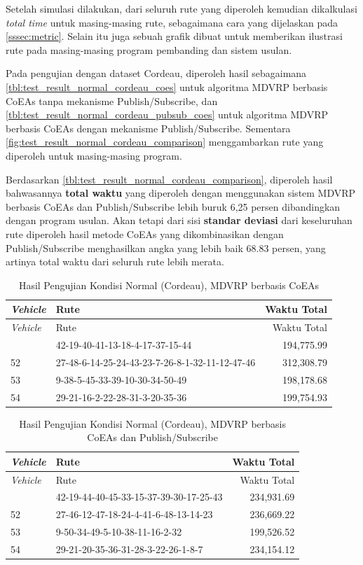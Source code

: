 Setelah simulasi dilakukan, dari seluruh rute yang diperoleh kemudian dikalkulasi \textit{total time} untuk masing-masing rute, sebagaimana cara yang dijelaskan pada \autoref{sssec:metric}. Selain itu juga sebuah grafik dibuat untuk memberikan ilustrasi rute pada masing-masing program pembanding dan sistem usulan.


Pada pengujian dengan dataset Cordeau, diperoleh hasil sebagaimana \autoref{tbl:test_result_normal_cordeau_coes} untuk algoritma MDVRP berbasis CoEAs tanpa mekanisme Publish/Subscribe, dan \autoref{tbl:test_result_normal_cordeau_pubsub_coes} untuk algoritma MDVRP berbasis CoEAs dengan mekanisme Publish/Subscribe. Sementara \autoref{fig:test_result_normal_cordeau_comparison} menggambarkan rute yang diperoleh untuk masing-masing program.


Berdasarkan \autoref{tbl:test_result_normal_cordeau_comparison}, diperoleh hasil bahwasannya \textbf{total waktu} yang diperoleh dengan menggunakan sistem MDVRP berbasis CoEAs dan Publish/Subscribe lebih buruk 6,25 persen  dibandingkan dengan program usulan. Akan tetapi dari sisi \textbf{standar deviasi} dari keseluruhan rute diperoleh hasil metode CoEAs yang dikombinasikan dengan Publish/Subscribe menghasilkan angka yang lebih baik 68.83 persen, yang artinya total waktu dari seluruh rute lebih merata.


\begin{longtable}[!]{lp{8cm}r}
	\caption{Hasil Pengujian Kondisi Normal (Cordeau), MDVRP berbasis CoEAs}
	\label{tbl:test_result_normal_cordeau_coes}\\
	\toprule
		\textit{Vehicle} & Rute & Waktu Total\\ 
	\midrule
	\endfirsthead
	\toprule
		\textit{Vehicle} & Rute & Waktu Total\\ 
	\midrule
	\endhead
	\bottomrule
	\endfoot
		51 & 42-19-40-41-13-18-4-17-37-15-44 & 194,775.99 \\
		52 & 27-48-6-14-25-24-43-23-7-26-8-1-32-11-12-47-46 & 312,308.79 \\
		53 & 9-38-5-45-33-39-10-30-34-50-49 & 198,178.68 \\
		54 & 29-21-16-2-22-28-31-3-20-35-36 & 199,754.93 \\
\end{longtable}


\begin{longtable}[!]{lp{8cm}r}
	\caption{Hasil Pengujian Kondisi Normal (Cordeau), MDVRP berbasis CoEAs dan Publish/Subscribe}
	\label{tbl:test_result_normal_cordeau_pubsub_coes}\\
	\toprule
		\textit{Vehicle} & Rute & Waktu Total\\ 
	\midrule
	\endfirsthead
	\toprule
		\textit{Vehicle} & Rute & Waktu Total\\ 
	\midrule
	\endhead
	\bottomrule
	\endfoot
		51 & 42-19-44-40-45-33-15-37-39-30-17-25-43 & 234,931.69 \\
		52 & 27-46-12-47-18-24-4-41-6-48-13-14-23 & 236,669.22 \\
		53 & 9-50-34-49-5-10-38-11-16-2-32 & 199,526.52 \\
		54 & 29-21-20-35-36-31-28-3-22-26-1-8-7 & 234,154.12 \\
\end{longtable}


